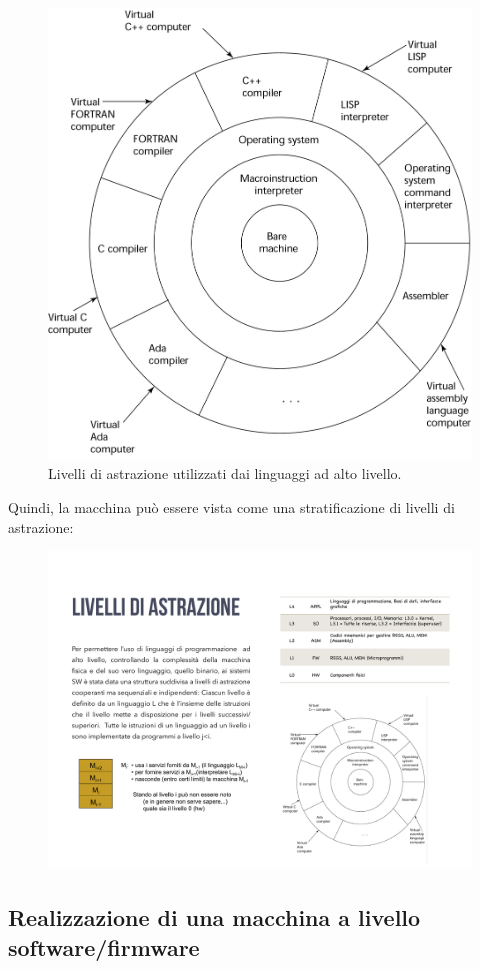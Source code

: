\documentclass[a4paper]{article}
\begin{document}
	\begin{figure}[!htp]
		\centering
		\includegraphics[width=.8\textwidth]{img/astrazione.png}
		\caption{Livelli di astrazione utilizzati dai linguaggi ad alto livello.}
	\end{figure}

	\noindent
	Quindi, la macchina può essere vista come una stratificazione di livelli di astrazione:
	\begin{figure}[!htp]
		\centering
		\includegraphics[width=.8\textwidth]{img/livelli_astrazione_macchina.pdf}
	\end{figure}\newpage

	\subsection{Realizzazione di una macchina a livello software/firmware}
	
\end{document}
